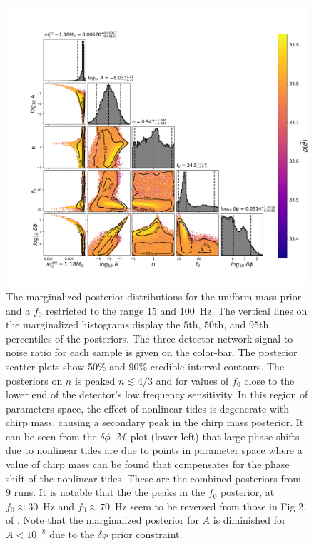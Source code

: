 \begin{figure}[th]
\includegraphics[width=\columnwidth]{figs/chapter6/combined_uni_dphi_cut_combined.png}
\caption{The marginalized posterior distributions for the uniform mass prior and a $f_0$ restricted to the range $15$ and $100$~Hz. The vertical lines on the marginalized histograms display the $5$th, $50$th, and $95$th percentiles of the posteriors. The three-detector network signal-to-noise ratio for each sample is given on the color-bar. The posterior scatter plots show 50\% and 90\% credible interval contours. The posteriors on $n$ is peaked $n \lesssim 4/3$ and for values of $f_0$ close to the lower end of the detector's low frequency sensitivity. In this region of parameters space, the effect of nonlinear tides is degenerate with chirp mass, causing a secondary peak in the chirp mass posterior. It can be seen from the $\delta\phi$--$\mathcal{M}$ plot (lower left) that large phase shifts due to nonlinear tides are due to points in parameter space where a value of chirp mass can be found that compensates for the phase shift of the nonlinear tides. These are the combined posteriors from $9$ runs. It is notable that the the peaks in the $f_0$ posterior, at $f_0 \approx 30$~Hz and $f_0 \approx 70$~Hz seem to be reversed from those in Fig 2. of \citep{abbott2019constraining}. Note that the marginalized posterior for $A$ is diminished for $A < 10^{-8}$ due to the $\delta \phi$ prior constraint.
}
\label{fig:uniform_f0_small}
\end{figure}

